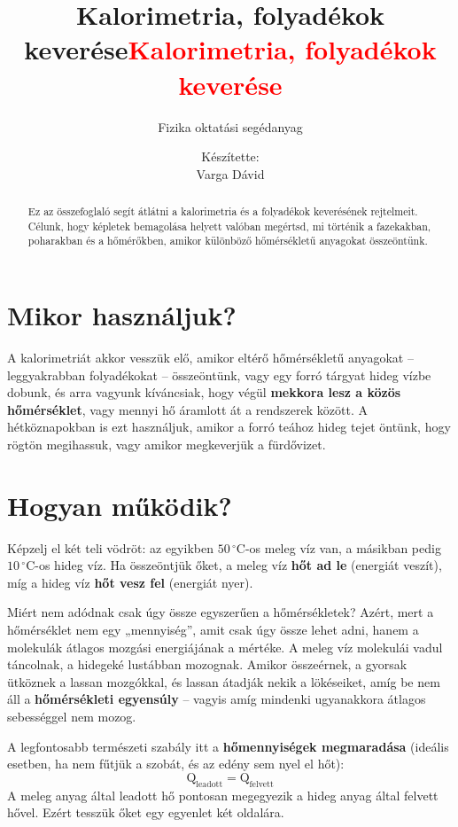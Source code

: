 \documentclass[11pt,a4paper]{article}
\title{Kalorimetria, folyadékok keverése}
\author{Fizika oktatási segédanyag}
\date{}
\providecommand{\textbfr}[1]{\textbf{\textcolor{red}{#1}}}
\begin{document}
\title{\textbfr{Kalorimetria, folyadékok keverése}}
\author{Készítette:\\Varga Dávid}
\date{}
\maketitle

\begin{abstract}
Ez az összefoglaló segít átlátni a kalorimetria és a folyadékok keverésének rejtelmeit. Célunk, hogy képletek bemagolása helyett valóban megértsd, mi történik a fazekakban, poharakban és a hőmérőkben, amikor különböző hőmérsékletű anyagokat összeöntünk.
\end{abstract}

\section{Mikor használjuk?}
A kalorimetriát akkor vesszük elő, amikor eltérő hőmérsékletű anyagokat – leggyakrabban folyadékokat – összeöntünk, vagy egy forró tárgyat hideg vízbe dobunk, és arra vagyunk kíváncsiak, hogy végül \textbf{mekkora lesz a közös hőmérséklet}, vagy mennyi hő áramlott át a rendszerek között. A hétköznapokban is ezt használjuk, amikor a forró teához hideg tejet öntünk, hogy rögtön megihassuk, vagy amikor megkeverjük a fürdővizet.

\section{Hogyan működik?}
Képzelj el két teli vödröt: az egyikben $50\,^\circ\text{C}$-os meleg víz van, a másikban pedig $10\,^\circ\text{C}$-os hideg víz. Ha összeöntjük őket, a meleg víz \textbf{hőt ad le} (energiát veszít), míg a hideg víz \textbf{hőt vesz fel} (energiát nyer). 

Miért nem adódnak csak úgy össze egyszerűen a hőmérsékletek? Azért, mert a hőmérséklet nem egy „mennyiség”, amit csak úgy össze lehet adni, hanem a molekulák átlagos mozgási energiájának a mértéke. A meleg víz molekulái vadul táncolnak, a hidegeké lustábban mozognak. Amikor összeérnek, a gyorsak ütköznek a lassan mozgókkal, és lassan átadják nekik a lökéseiket, amíg be nem áll a \textbf{hőmérsékleti egyensúly} – vagyis amíg mindenki ugyanakkora átlagos sebességgel nem mozog.

A legfontosabb természeti szabály itt a \textbf{hőmennyiségek megmaradása} (ideális esetben, ha nem fűtjük a szobát, és az edény sem nyel el hőt):
$$\text{Q}_{\text{leadott}} = \text{Q}_{\text{felvett}}$$
A meleg anyag által leadott hő pontosan megegyezik a hideg anyag által felvett hővel. Ezért tesszük őket egy egyenlet két oldalára.
\end{document}
